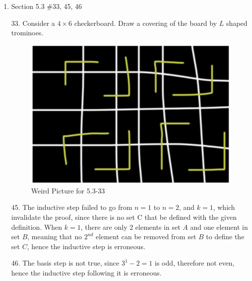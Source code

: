 \documentclass[12pt]{article}
\begin{document}
\begin{enumerate}
\begin{enumerate}
        \end{enumerate}
        \newpage
        \item Section 5.3 \#33, 45, 46
            \item[33.] Consider a $4 \times 6$ checkerboard. Draw a covering of the board by $L $ shaped trominoes.

            \begin{figure}[!h]
                \centering
                \includegraphics[width=0.25\linewidth]{Picture Folder//HW02/HW04_5.3-33.png}
                \caption{Weird Picture for 5.3-33}
                \label{fig:5.3-33}
            \end{figure}

            \item[45.] The inductive step failed to go from $n=1$ to $n=2$, and $k=1$, which invalidate the proof, since there is no set C that be defined with the given definition. When $k=1$, there are only 2 elements in set $A$ and one element in set $B$, meaning that no $2^{nd}$ element can be removed from set $B$ to define the set $C$, hence the inductive step is erroneous. 

            \item[46.] The basis step is not true, since $3^1-2=1$ is odd, therefore not even, hence the inductive step following it is erroneous. 

        \newpage


\end{enumerate}
\end{document}
